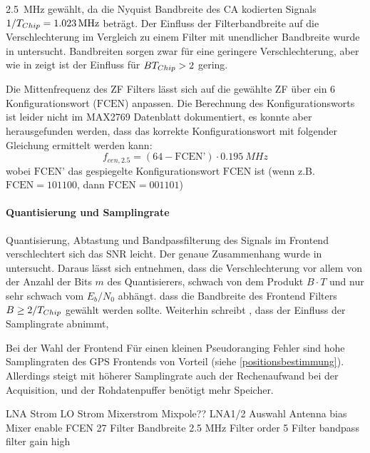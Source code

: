 \SI{2.5}{MHz} gewählt, da die Nyquist Bandbreite des \gls{CA} kodierten Signals $1/\gpsTchip=\SI{1.023}{\MHz}$ beträgt. Der Einfluss der Filterbandbreite auf die Verschlechterung im Vergleich zu einem Filter mit unendlicher Bandbreite wurde in \cite{itc1982chang} untersucht. Bandbreiten sorgen zwar für eine geringere Verschlechterung, aber wie in  zeigt ist der Einfluss für $B {T}_{Chip}>2$ gering.

Die Mittenfrequenz des ZF Filters lässt sich auf die gewählte ZF über ein \SI{6}{\bit} Konfigurationswort ($\textrm{FCEN}$) anpassen. Die Berechnung des Konfigurationsworts ist leider nicht im MAX2769 Datenblatt dokumentiert, es konnte aber herausgefunden werden, dass das korrekte Konfigurationswort mit folgender Gleichung ermittelt werden kann: 
\begin{equation}
    f_{cen,2.5} = (64 - \textrm{FCEN'}) \cdot \SI{0.195}{MHz}
\end{equation}
wobei $\textrm{FCEN'}$ das gespiegelte Konfigurationswort $\textrm{FCEN}$ ist (wenn z.B. $\textrm{FCEN}=101100$, dann $\textrm{FCEN}=001101$)

\paragraph{Quantisierung und Samplingrate}
Quantisierung, Abtastung und Bandpassfilterung des Signals im Frontend verschlechtert sich das SNR leicht. Der genaue Zusammenhang wurde in \cite{itc1982chang} untersucht. Daraus lässt sich entnehmen, dass die Verschlechterung vor allem von der Anzahl der Bits $m$ des Quantisierers, schwach von dem Produkt $B\cdot T$ und nur sehr schwach vom $E_b/N_0$ abhängt. dass die Bandbreite des Frontend Filters $B\geq 2/{T}_{Chip}$ gewählt werden sollte. Weiterhin schreibt \cite{itc1982chang}, dass der Einfluss der Samplingrate abnimmt, 

Bei der Wahl der Frontend Für einen kleinen Pseudoranging Fehler sind hohe Samplingraten des GPS Frontends von Vorteil (siehe \ref{positionsbestimmung}). Allerdings steigt mit höherer Samplingrate auch der Rechenaufwand bei der Acquisition, und der Rohdatenpuffer benötigt mehr Speicher. 

%

LNA Strom
LO Strom
Mixerstrom
Mixpole??
LNA1/2 Auswahl
Antenna bias
Mixer enable
FCEN 27
Filter Bandbreite 2.5 MHz
Filter order 5
Filter bandpass
filter gain high

